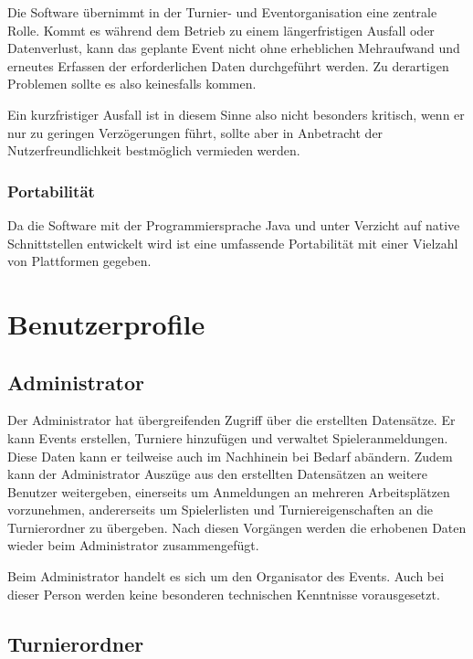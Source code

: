 \documentclass[11pt]{article}
\begin{document}
Die Software übernimmt in der Turnier- und Eventorganisation eine zentrale Rolle. Kommt es während dem Betrieb zu einem längerfristigen Ausfall oder Datenverlust, kann das geplante Event nicht ohne erheblichen Mehraufwand und erneutes Erfassen der erforderlichen Daten durchgeführt werden. Zu derartigen Problemen sollte es also keinesfalls kommen.

Ein kurzfristiger Ausfall ist in diesem Sinne also nicht besonders kritisch, wenn er nur zu geringen Verzögerungen führt, sollte aber in Anbetracht der Nutzerfreundlichkeit bestmöglich vermieden werden.

\subsubsection{Portabilität}

Da die Software mit der Programmiersprache Java und unter Verzicht auf native Schnittstellen entwickelt wird ist eine umfassende Portabilität mit einer Vielzahl von Plattformen gegeben.

\newpage

\section{Benutzerprofile}

\subsection{Administrator}

Der Administrator hat übergreifenden Zugriff über die erstellten Datensätze. Er kann Events erstellen, Turniere hinzufügen und verwaltet Spieleranmeldungen. Diese Daten kann er teilweise auch im Nachhinein bei Bedarf abändern. Zudem kann der Administrator Auszüge aus den erstellten Datensätzen an weitere Benutzer weitergeben, einerseits um Anmeldungen an mehreren Arbeitsplätzen vorzunehmen, andererseits um Spielerlisten und Turniereigenschaften an die Turnierordner zu übergeben. Nach diesen Vorgängen werden die erhobenen Daten wieder beim Administrator zusammengefügt.

Beim Administrator handelt es sich um den Organisator des Events. Auch bei dieser Person werden keine besonderen technischen Kenntnisse vorausgesetzt.

\subsection{Turnierordner}
\end{document}
